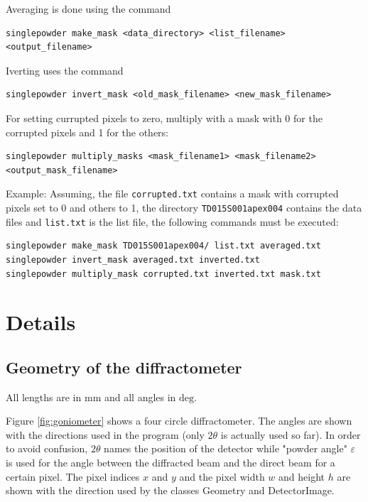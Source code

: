 \documentclass[a4paper, 12pt, twoside]{scrartcl}
\begin{document}
Averaging is done using the command

\begin{verbatim}
singlepowder make_mask <data_directory> <list_filename> <output_filename>
\end{verbatim}

Iverting uses the command

\begin{verbatim}
singlepowder invert_mask <old_mask_filename> <new_mask_filename>
\end{verbatim}

For setting currupted pixels to zero, multiply with a mask with 0 for the corrupted pixels and 1 for the others:

\begin{verbatim}
singlepowder multiply_masks <mask_filename1> <mask_filename2> <output_mask_filename>
\end{verbatim}

Example: Assuming, the file \verb|corrupted.txt| contains a mask with corrupted pixels set to 0 and others to 1, the directory \verb|TD015S001apex004| contains the data files and \verb|list.txt| is the list file, the following commands must be executed:

\begin{verbatim}
singlepowder make_mask TD015S001apex004/ list.txt averaged.txt
singlepowder invert_mask averaged.txt inverted.txt
singlepowder multiply_mask corrupted.txt inverted.txt mask.txt
\end{verbatim}

\section{Details}
\subsection{Geometry of the diffractometer}

All lengths are in $ \mathrm{mm} $ and all angles in $ \mathrm{deg} $.

Figure \ref{fig:goniometer} shows a four circle diffractometer. The angles are shown with the directions used in the program (only $ 2\theta $ is actually used so far). In order to avoid confusion, $ 2\theta $ names the position of the detector while "powder angle" $ \varepsilon $ is used for the angle between the diffracted beam and the direct beam for a certain pixel. The pixel indices $ x $ and $ y $ and the pixel width $ w $ and height $ h $ are shown with the direction used by the classes Geometry and DetectorImage.
\end{document}
